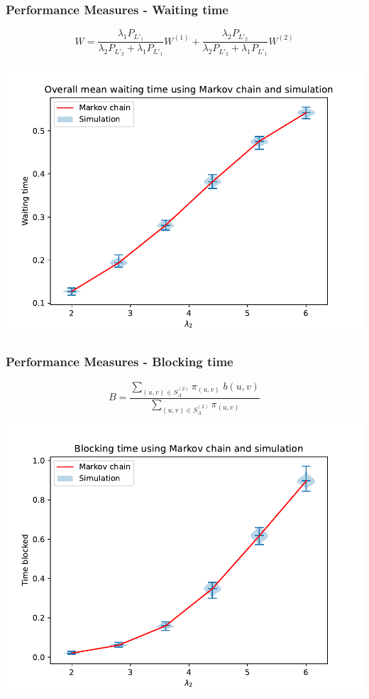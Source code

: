\begin{frame}
    \frametitle{Performance Measures - Waiting time}
    \centering
    \begin{equation}
        W = \frac{\lambda_1 P_{L'_1}}{\lambda_2 P_{L'_2} + \lambda_1 P_{L'_1}} W^{(1)} 
        + \frac{\lambda_2 P_{L'_2}}{\lambda_2 P_{L'_2} + \lambda_1 P_{L'_1}} W^{(2)}
    \end{equation}

    \includegraphics[scale=0.5]{Bin/waiting_overall_comparison.pdf}
\end{frame}


\begin{frame}
    \frametitle{Performance Measures - Blocking time}
    \centering
    \begin{equation}
        B = \frac{\sum_{(u,v) \in S_A^{(2)}} \pi_{(u,v)} \; 
        b(u,v)}{\sum_{(u,v) \in S_A^{(2)}} \pi_{(u,v)}}
    \end{equation}

    \includegraphics[scale=0.5]{Bin/blocking_comparison.pdf}
\end{frame}


